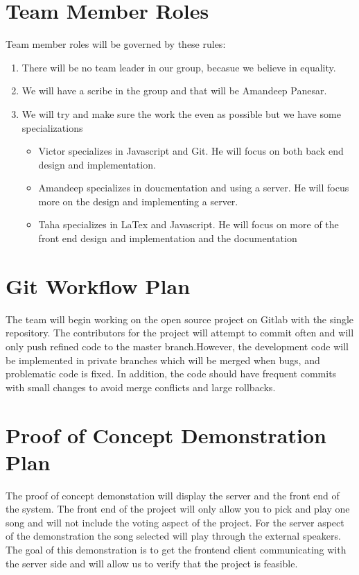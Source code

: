 \documentclass{article}
\begin{document}
\section{Team Member Roles}
Team member roles will be governed by these rules:
\begin{enumerate}
\item There will be no team leader in our group, becasue we believe in equality.
\item We will have a scribe in the group and that will be Amandeep Panesar.
\item We will try and make sure the work the even as possible but we have some specializations
\begin{itemize}
\item Victor specializes in Javascript and Git. He will focus on both back end design and implementation.
\item Amandeep specializes in doucmentation and using a server. He will focus more on the design and implementing a server.
\item Taha specializes in LaTex and Javascript. He will focus on more of the front end design and implementation and the documentation
\end{itemize}
\end{enumerate}
\section{Git Workflow Plan}
The team will begin working on the open source project on Gitlab with the single repository. The contributors for the project will attempt to commit often and will only push refined code to the master branch.However, the development code will be implemented in private branches which will be merged when bugs, and problematic code is fixed. In addition, the code should have frequent commits with small changes to avoid merge conflicts and large rollbacks.
\section{Proof of Concept Demonstration Plan}
The proof of concept demonstation will display the server and the front end of the system. The front end of the project will only allow you to pick and play one song and will not include the voting aspect of the project. For the server aspect of the demonstration the song selected will play through the external speakers. The goal of this demonstration is to get the frontend client communicating with the server side and will allow us to verify that the project is feasible.
\end{document}

